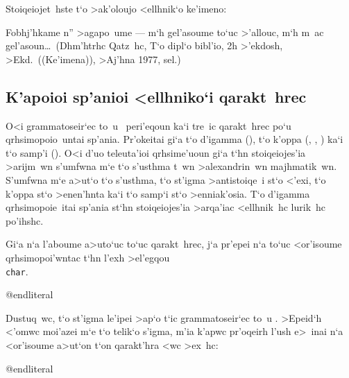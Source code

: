\exercise Stoiqeiojet~hste t`o >ak'oloujo <ellhnik`o ke'imeno:

{\narrower\noindent Fobhj'hkame n'' >agapo~ume --- m`h gel'asoume to`uc
>'allouc, m`h m~ac gel'asoun\dots\ (Dh\-m'h\-trhc Qatz~hc, {\tengs T`o
dipl`o bibl'io}, 2h >'ekdosh, >Ekd.\ ((Ke'imena)), >Aj'hna 1977,
sel.)

}

\subsection{K'apoioi sp'anioi <ellhniko`i qarakt~hrec}

O<i grammatoseir`ec to~u \greektex\ peri'eqoun ka`i tre~ic qarakt~hrec
po`u qrh\-si\-mo\-poi\-o~untai sp'ania. Pr'okeitai gi`a t`o d'igamma
(\digamma),  t`o k'oppa (\Koppa, \koppa, \varkoppa) ka`i t`o samp'i
(\sampi).  O<i d'uo teleuta'ioi qrhsime'uoun gi`a t`hn stoiqeiojes'ia
>arijm~wn s'umfwna m`e t`o s'usthma t~wn >alexandrin~wn majhmatik~wn. 
S'umfwna m`e a>ut`o t`o s'usthma, t`o st'igma >antistoiqe~i st`o <'exi,
t`o k'oppa st`o >enen'hnta ka`i t`o samp`i st`o >enniak'osia.  T`o
d'igamma qrhsimopoie~itai sp'ania st`hn stoiqeiojes'ia >arqa'iac
<ellhnik~hc lurik~hc po'ihshc.

Gi`a n`a l'aboume a>uto`uc to`uc qarakt~hrec, j`a pr'epei n`a to`uc
<or'isoume qrhsimopoi'wntac t`hn l'exh >el'egqou {\tt\\char}.%

\beginliteral@obeyspaces
\def\digamma{\char'020}    %
\def\Koppa{\char'022}      %
\def\koppa{\char'023}      %
\def\varkoppa{\char'021}   %
\def\sampi{\char'024}      %
\def\numbertick{\char'003} %
\def\pretick{\char'004}    %
@endliteral

\noindent
Dustuq~wc, t`o st'igma le'ipei >ap`o t`ic grammatoseir`ec to~u
\greektex\null.  >Epeid`h <'omwc moi'azei m`e t`o telik`o s'igma,
m'ia k'apwc pr'oqeirh l'ush e>~inai n`a <or'isoume a>ut`on t`on
qarakt'hra <wc >ex~hc:

\beginliteral@obeyspaces
\def\stigma{\char'143}     %
@endliteral

